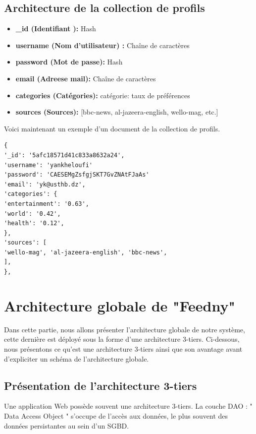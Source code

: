 \subsection{Architecture de la collection de profils}

\begin{itemize}
    \item \textbf{\_id (Identifiant ): } Hash
    \item \textbf{username (Nom d'utilisateur) : } Chaîne de caractères
    \item \textbf{password (Mot de passe): } Hash
    \item \textbf{email (Adreese mail): } Chaîne de caractères
    \item \textbf{categories (Catégories): } {catégorie: taux de préférences }
    \item \textbf{sources (Sources): } [\textquotesingle bbc-news\textquotesingle, \textquotesingle al-jazeera-english\textquotesingle, \textquotesingle wello-mag\textquotesingle, etc.] 
\end{itemize}
Voici maintenant un exemple d'un document de la collection de profils.
\begin{lstlisting}[style=code]
{
'_id': '5afc18571d41c833a8632a24', 
'username': 'yankheloufi'
'password': 'CAESEMgZsfgjSKT7GvZNAtFJaAs'
'email': 'yk@usthb.dz',
'categories': {
'entertainment': '0.63',
'world': '0.42',
'health': '0.12',
},
'sources': [
'wello-mag', 'al-jazeera-english', 'bbc-news', 
],
},
\end{lstlisting}







\section{Architecture globale de "Feedny"}
Dans cette partie, nous allons présenter l'architecture globale de notre système, cette dernière est déployé sous la forme d'une architecture 3-tiers. Ci-dessous, nous présentons ce qu'est une architecture 3-tiers ainsi que son avantage avant d'expliciter un schéma de l'architecture globale.
\subsection{Présentation de l’architecture 3-tiers}

Une application Web possède souvent une architecture 3-tiers.
La couche DAO : " Data Access Object " s’occupe de l’accès aux données, le plus souvent des
données persistantes au sein d’un SGBD.


